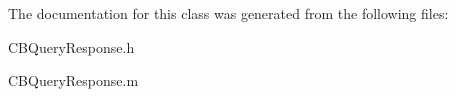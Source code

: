 The documentation for this class was generated from the following files\+:\begin{DoxyCompactItemize}
\item 
C\+B\+Query\+Response.\+h\item 
C\+B\+Query\+Response.\+m\end{DoxyCompactItemize}
